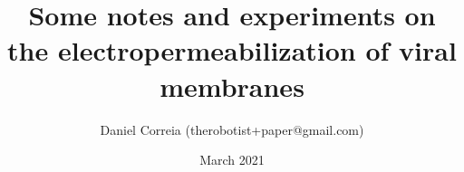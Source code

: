 \documentclass[paper.tex]{subfiles}
\begin{document}




\title{Some notes and experiments on the electropermeabilization of viral membranes}
\author{\small{Daniel Correia (therobotist+paper@gmail.com)}}
\date{March 2021}


\flushbottom 
\maketitle
\thispagestyle{empty}

\renewcommand{\abstractname}{Summary}    %
\end{document}
